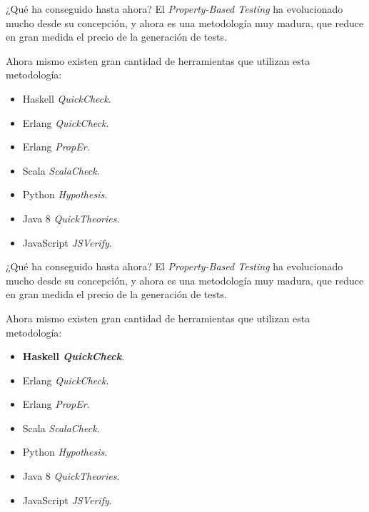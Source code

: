 \documentclass[10pt]{beamer}
\begin{document}
\begin{frame}{¿Qué ha conseguido hasta ahora?}
  El \textit{Property-Based Testing} ha evolucionado mucho desde su
  concepción, y ahora es una metodología muy madura, que reduce en
  gran medida el precio de la generación de tests.

  Ahora mismo existen gran cantidad de herramientas que utilizan esta
  metodología:
  \begin{itemize}
  \item Haskell \textit{QuickCheck}.
  \item Erlang \textit{QuickCheck}.
  \item Erlang \textit{PropEr}.
  \item Scala \textit{ScalaCheck}.
  \item Python \textit{Hypothesis}.
  \item Java 8 \textit{QuickTheories}.
  \item JavaScript \textit{JSVerify}.
  \end{itemize}
\end{frame}

\begin{frame}{¿Qué ha conseguido hasta ahora?}
  El \textit{Property-Based Testing} ha evolucionado mucho desde su
  concepción, y ahora es una metodología muy madura, que reduce en
  gran medida el precio de la generación de tests.

  Ahora mismo existen gran cantidad de herramientas que utilizan esta
  metodología:
  \begin{itemize}
  \item \textbf{Haskell \textit{QuickCheck}}.
  \item Erlang \textit{QuickCheck}.
  \item Erlang \textit{PropEr}.
  \item Scala \textit{ScalaCheck}.
  \item Python \textit{Hypothesis}.
  \item Java 8 \textit{QuickTheories}.
  \item JavaScript \textit{JSVerify}.
  \end{itemize}
\end{frame}
\end{document}
